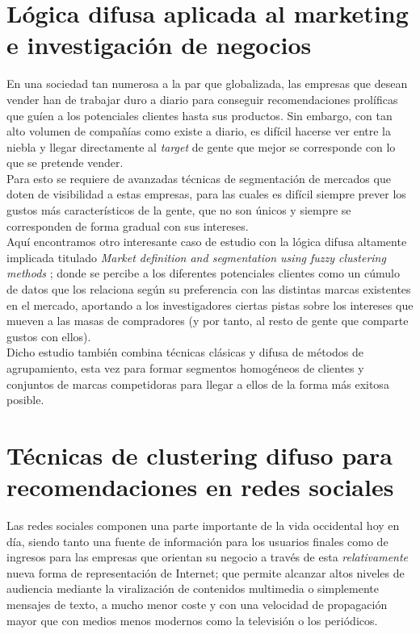 \documentclass[]{report}
\begin{document}
		\section{Lógica difusa aplicada al marketing e investigación de negocios}
		
			En una sociedad tan numerosa a la par que globalizada, las empresas que desean vender han de trabajar duro a diario para conseguir recomendaciones prolíficas que guíen a los potenciales clientes hasta sus productos. Sin embargo, con tan alto volumen de compañías como existe a diario, es difícil hacerse ver entre la niebla y llegar directamente al \textit{target} de gente que mejor se corresponde con lo que se pretende vender.\\
			
			Para esto se requiere de avanzadas técnicas de segmentación de mercados que doten de visibilidad a estas empresas, para las cuales es difícil siempre prever los gustos más característicos de la gente, que no son únicos y siempre se corresponden de forma gradual con sus intereses.\\
			
			Aquí encontramos otro interesante caso de estudio con la lógica difusa altamente implicada titulado \textit{Market definition and segmentation using fuzzy clustering methods} \cite{marketing}; donde se percibe a los diferentes potenciales clientes como un cúmulo de datos que los relaciona según su preferencia con las distintas marcas existentes en el mercado, aportando a los investigadores ciertas pistas sobre los intereses que mueven a las masas de compradores (y por tanto, al resto de gente que comparte gustos con ellos).\\
			
			Dicho estudio también combina técnicas clásicas y difusa de métodos de agrupamiento, esta vez para formar segmentos homogéneos de clientes y conjuntos de marcas competidoras para llegar a ellos de la forma más exitosa posible.
			
		\section{Técnicas de clustering difuso para recomendaciones en redes sociales}
		
			Las redes sociales componen una parte importante de la vida occidental hoy en día, siendo tanto una fuente de información para los usuarios finales como de ingresos para las empresas que orientan su negocio a través de esta \textit{relativamente} nueva forma de representación de Internet; que permite alcanzar altos niveles de audiencia mediante la viralización de contenidos multimedia o simplemente mensajes de texto, a mucho menor coste y con una velocidad de propagación mayor que con medios menos modernos como la televisión o los periódicos.\\
			
\end{document}
